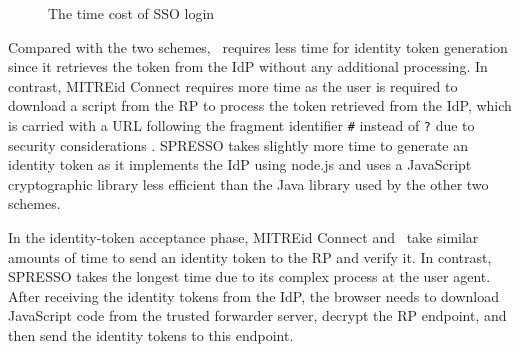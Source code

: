 \begin{figure}[tb]
  \centering
  \caption{The time cost of SSO login}
  \label{fig:evaluation}
\end{figure}

Compared with the two schemes, \usso~requires less time for identity token generation since it retrieves the token from the IdP without any additional processing. In contrast,
MITREid Connect requires more time as the user is required to download a script from the RP to process the token retrieved from the IdP, which is carried with a URL following the fragment identifier \verb+#+ instead of \verb+?+ due to security considerations \cite{de2014oauth}. SPRESSO takes slightly more time to generate an identity token as it implements the IdP using node.js and uses a JavaScript cryptographic library less efficient than the Java library used by the other two schemes.

In the identity-token acceptance phase, MITREid Connect and \usso~take similar amounts of time to send an identity token to the RP and verify it.
In contrast, SPRESSO takes the longest time due to its complex process at the user agent.
After receiving the identity tokens from the IdP, the browser needs to download JavaScript code from the trusted forwarder server, decrypt the RP endpoint, and then send the identity tokens to this endpoint.

